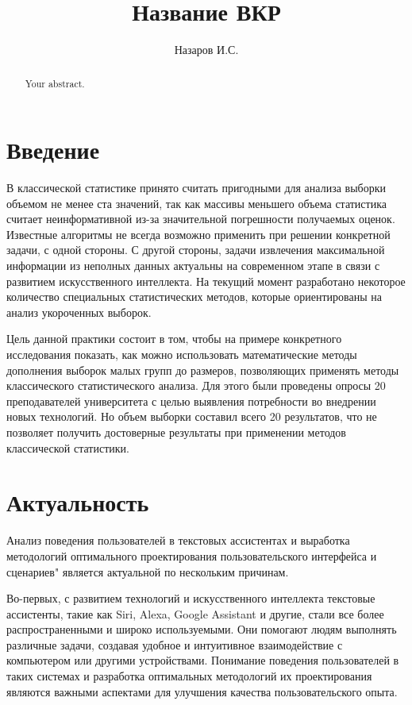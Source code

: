 \documentclass{article}
\title{Название ВКР}
\author{Назаров И.С.}
\begin{document}
\maketitle

\begin{abstract}
Your abstract.
\end{abstract}

\section{Введение}
В классической статистике принято считать пригодными для анализа выборки объемом не менее ста значений, так как массивы меньшего объема статистика считает неинформативной из-за значительной погрешности получаемых оценок. Известные алгоритмы не всегда возможно применить при решении конкретной задачи, с одной стороны. С другой стороны, задачи извлечения максимальной информации из неполных данных актуальны на современном этапе в связи с развитием искусственного интеллекта.  На текущий момент разработано некоторое количество специальных статистических методов, которые ориентированы на анализ укороченных выборок. 


Цель данной практики состоит в том, чтобы на примере конкретного 
исследования показать, как можно использовать математические методы 
дополнения выборок малых групп до размеров, позволяющих применять 
методы классического статистического анализа. Для этого были 
проведены опросы 20 преподавателей университета с целью выявления 
потребности во внедрении новых технологий. Но объем выборки составил всего 20 результатов, что не позволяет получить достоверные результаты 
при применении методов классической статистики.


\section{Актуальность}
Анализ поведения пользователей в текстовых ассистентах и выработка методологий оптимального проектирования пользовательского интерфейса и сценариев" является актуальной по нескольким причинам.

Во-первых, с развитием технологий и искусственного интеллекта текстовые ассистенты, такие как Siri, Alexa, Google Assistant и другие, стали все более распространенными и широко используемыми. Они помогают людям выполнять различные задачи, создавая удобное и интуитивное взаимодействие с компьютером или другими устройствами. Понимание поведения пользователей в таких системах и разработка оптимальных методологий их проектирования являются важными аспектами для улучшения качества пользовательского опыта.
\end{document}
